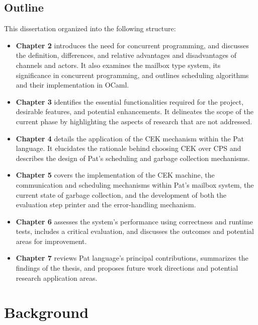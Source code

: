 \documentclass{l4proj}
\begin{document}
\section{Outline}
This dissertation organized into the following structure:

\begin{itemize}
  \item \textbf{Chapter 2} introduces the need for concurrent programming, and discusses the definition, differences, and relative advantages and disadvantages of channels and actors. It also examines the mailbox type system, its significance in concurrent programming, and outlines scheduling algorithms and their implementation in OCaml.
  
  \item \textbf{Chapter 3} identifies the essential functionalities required for the project, desirable features, and potential enhancements. It delineates the scope of the current phase by highlighting the aspects of research that are not addressed.
  
  \item \textbf{Chapter 4} details the application of the CEK mechanism within the Pat language. It elucidates the rationale behind choosing CEK over CPS and describes the design of Pat's scheduling and garbage collection mechanisms.
  
  \item \textbf{Chapter 5} covers the implementation of the CEK machine, the communication and scheduling mechanisms within Pat's mailbox system, the current state of garbage collection, and the development of both the evaluation step printer and the error-handling mechanism.
  
  \item \textbf{Chapter 6} assesses the system's performance using correctness and runtime tests, includes a critical evaluation, and discusses the outcomes and potential areas for improvement.
  
  \item \textbf{Chapter 7} reviews Pat language's principal contributions, summarizes the findings of the thesis, and proposes future work directions and potential research application areas.
\end{itemize}


\chapter{Background}
\end{document}
